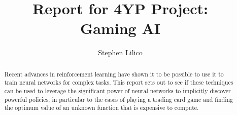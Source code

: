 \documentclass[twoside,11pt]{article}
\title{Report for 4YP Project: \\ Gaming AI}
\author{Stephen Lilico}
\begin{document}
  \maketitle
  
  \newpage
  
  \newpage
  \begin{abstract}
	Recent advances in reinforcement learning have shown it to be possible to use it to train neural networks for complex tasks. This report sets out to see if these techniques can be used to leverage the significant power of neural networks to implicitly discover powerful policies, in particular to the cases of playing a trading card game and finding the optimum value of an unknown function that is expensive to compute.
	
  \end{abstract}
  \tableofcontents 
  
  
  
  
  
  
  
  
  
  
  
\end{document}
